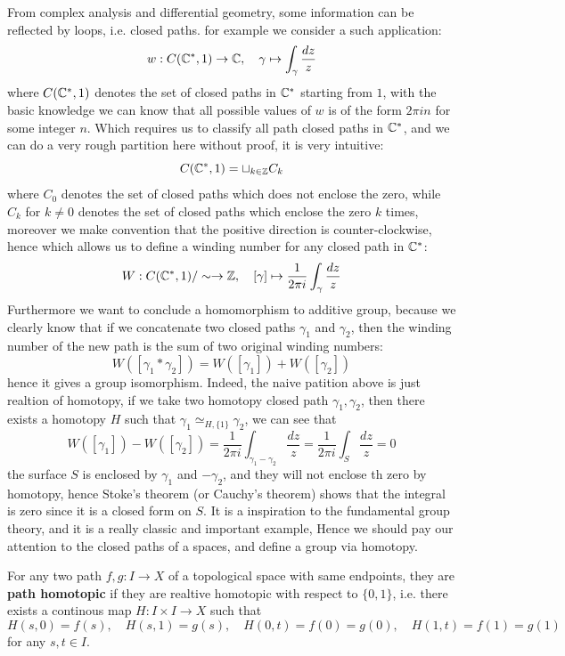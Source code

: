 From complex analysis and differential geometry, some information can be reflected by loops, i.e. closed paths. for example we consider a such application:
\[w: C(\mathbb{C}^*,1) \to \mathbb{C}, \quad \gamma \mapsto \int_{\gamma}\frac{dz}{z}\]
where \(C(\mathbb{C}^*,1)\) denotes the set of closed paths in \(\mathbb{C}^*\) starting from \(1\), with the basic knowledge we can know that all possible values of \(w\) is of the form \(2\pi i n\) for some integer \(n\). Which requires us to classify all path closed paths in \(\mathbb{C}^*\), and we can do a very rough partition here without proof, it is very intuitive:
\[C(\mathbb{C}^*,1) = \sqcup_{k \in \mathbb{Z}}C_k\]
where \(C_0\) denotes the set of closed paths which does not enclose the zero, while \(C_k\) for \(k \neq 0\) denotes the set of closed paths which enclose the zero \(k\) times, moreover we make convention that the positive direction is counter-clockwise, hence which allows us to define a winding number for any closed path in \(\mathbb{C}^*\):
\[W:C(\mathbb{C}^*,1)/\sim \to \mathbb{Z}, \quad [\gamma] \mapsto \frac{1}{2 \pi i}\int_{\gamma}\frac{dz}{z} \]
Furthermore we want to conclude a homomorphism to additive group, because we clearly know that if we concatenate two closed paths \(\gamma_1\) and \(\gamma_2\), then the winding number of the new path is the sum of two original winding numbers:
\[W([\gamma_1 * \gamma_2]) = W([\gamma_1]) + W([\gamma_2])\]
hence it gives a group isomorphism. Indeed, the naive patition above is just realtion of homotopy, if we take two homotopy closed path \(\gamma_1,\gamma_2\), then there exists a homotopy \(H\) such that \(\gamma_1 \simeq_{H,\{1\}} \gamma_2\), we can see that
\[W([\gamma_1])-W([\gamma_2]) = \frac{1}{2\pi i }\int_{\gamma_1 - \gamma_2}\frac{dz}{z} = \frac{1}{2 \pi i }\int_S \frac{dz}{z} = 0\]
the surface \(S\) is enclosed by \(\gamma_1\) and \(-\gamma_2\), and they will not enclose th zero by homotopy, hence Stoke's theorem (or Cauchy's theorem) shows that the integral is zero since it is a closed form on \(S\). It is a inspiration to the fundamental group theory, and it is a really classic and important example, Hence we should pay our attention to the closed paths of a spaces, and define a group via homotopy.

\begin{definition}
    For any two path \(f,g:I \to X\) of a topological space with same endpoints, they are \textbf{path homotopic} if they are realtive homotopic with respect to \(\{0,1\}\), i.e. there exists a continous map \(H:I \times I \to X\) such that
    \[H(s,0) = f(s), \quad H(s,1) = g(s), \quad H(0,t) = f(0) = g(0), \quad H(1,t) = f(1) = g(1)\]
    for any \(s,t \in I\). 
\end{definition}

